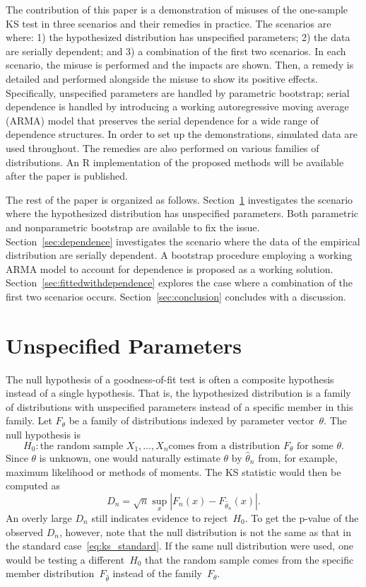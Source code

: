 \documentclass[12pt, letterpaper, titlepage]{article}
\begin{document}
The contribution of this paper is a demonstration of misuses of the one-sample
KS test in three scenarios and their remedies in practice. The scenarios are
where:
1) the hypothesized distribution has unspecified parameters;
2) the data are serially dependent; and
3) a combination of the first two scenarios.
In each scenario, the misuse is performed and the impacts are shown. Then, a
remedy is detailed and performed alongside the misuse to show its positive
effects. Specifically, unspecified parameters are handled by parametric
bootstrap; serial dependence is handled by introducing a working autoregressive
moving average (ARMA) model that preserves the serial dependence for a wide
range of dependence structures.
In order to set up the demonstrations, simulated data are used
throughout. The remedies are also performed on various families of
distributions. An R implementation of the proposed methods will be available
after the paper is published.


The rest of the paper is organized as follows. Section~\ref{sec:fitted}
investigates the scenario where the hypothesized distribution has unspecified
parameters. Both parametric and nonparametric bootstrap are available to fix the
issue. Section~\ref{sec:dependence} investigates the scenario where the data of
the empirical distribution are serially dependent. A bootstrap procedure
employing a working ARMA model to account for dependence is proposed as a
working solution. Section~\ref{sec:fittedwithdependence}
explores the case where a combination of the first two scenarios occurs.
Section~\ref{sec:conclusion} concludes with a discussion.

\section{Unspecified Parameters}
\label{sec:fitted}

The null hypothesis of a goodness-of-fit test is often a composite hypothesis
instead of a single hypothesis. That is, the hypothesized distribution is a
family of distributions with unspecified parameters instead of a specific member
in this family. Let $F_\theta$ be a family of distributions indexed by parameter
vector~$\theta$. The null hypothesis is
\[
  H_0: \text{the random sample $X_1, \ldots, X_n$
    comes from a distribution $F_\theta$ for some $\theta$.}
\]
Since $\theta$ is unknown, one would naturally estimate $\theta$ by
$\hat\theta_n$ from, for example, maximum likelihood or methods of moments. The
KS statistic would then be computed as
\begin{equation}
  \label{eq:ks_fitted}
  D_n = \sqrt{n} \sup_x | F_n(x) - F_{\hat\theta_n}(x) |.
\end{equation}
An overly large $D_n$ still indicates evidence to reject~$H_0$. To get the
p-value of the observed $D_n$, however, note that the null distribution is not
the same as that in the standard
case~\eqref{eq:ks_standard}. If the same null distribution were used, one would
be testing a different~$H_0$ that the random sample comes from the specific
member distribution~$F_{\hat\theta}$ instead of the family~$F_\theta$.
\end{document}
